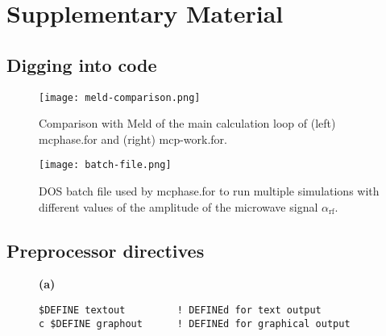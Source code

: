 \section{Supplementary Material}

\begin{supplement}



\subsection{Digging into code}

\begin{figure}[h]
	\centering
	\texttt{[image: meld-comparison.png]}
	\caption{Comparison with Meld of the main calculation loop of (left) \textsf{mcphase.for} and (right) \textsf{mcp-work.for}.}
	\label{fig:meld-comparison}
\end{figure}

\begin{figure}[h]
	\centering
	\texttt{[image: batch-file.png]}
	\caption{DOS batch file used by \textsf{mcphase.for} to run multiple simulations with different values of the amplitude of the microwave signal $\alpha_\mathrm{rf}$.}
	\label{fig:batch-file}
\end{figure}


\clearpage
\subsection{Preprocessor directives}

\begin{figure}[h]
\centering

\begin{minipage}{0.75\textwidth}
\textbf{(a)}
\begin{lstlisting}
$DEFINE textout			! DEFINEd for text output
c $DEFINE graphout		! DEFINEd for graphical output


\end{lstlisting}
\end{minipage}
\end{figure}
\end{supplement}
